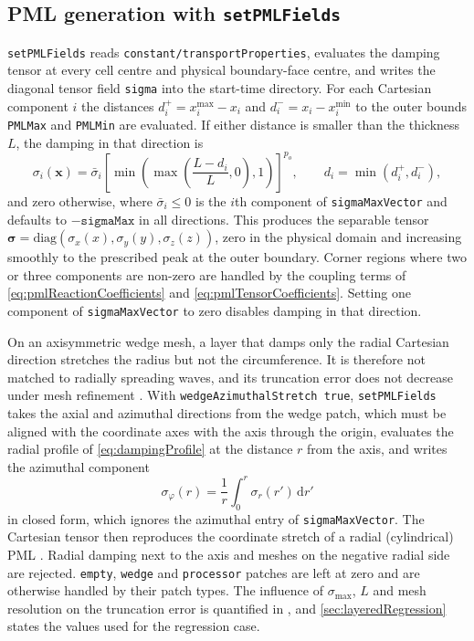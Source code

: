 \documentclass[final,12pt,nopreprintline]{elsarticle}
\newcommand{\code}[1]{\texttt{#1}}
\begin{document}
\subsection{PML generation with \code{setPMLFields}}
\label{sec:setPMLFields}

\code{setPMLFields} reads \code{constant/transportProperties}, evaluates the
damping tensor at every cell centre and physical boundary-face centre, and
writes the diagonal tensor field \code{sigma} into the start-time directory.
For each Cartesian component $i$ the distances $d_i^{+}=x_i^{\max}-x_i$ and
$d_i^{-}=x_i-x_i^{\min}$ to the outer bounds \code{PMLMax} and \code{PMLMin}
are evaluated.  If either distance is smaller than the thickness $L$, the
damping in that direction is
\begin{equation}
    \sigma_i(\mathbf{x})
    =
    \bar{\sigma}_i
    \left[
    \min\left(\max\left(\frac{L-d_i}{L},0\right),1\right)
    \right]^{p_o},
    \qquad
    d_i=\min(d_i^{+},d_i^{-}),
    \label{eq:dampingProfile}
\end{equation}
and zero otherwise, where $\bar{\sigma}_i\le0$ is the $i$th component of
\code{sigmaMaxVector} and defaults to $-\code{sigmaMax}$ in all directions.
This produces the separable tensor
$\boldsymbol{\sigma}=\mathrm{diag}(\sigma_x(x),\sigma_y(y),\sigma_z(z))$,
zero in the physical domain and increasing smoothly to the prescribed peak at
the outer boundary.  Corner regions where two or three components are
non-zero are handled by the coupling terms of \cref{eq:pmlReactionCoefficients}
and \cref{eq:pmlTensorCoefficients}.  Setting one component of
\code{sigmaMaxVector} to zero disables damping in that direction.

On an axisymmetric wedge mesh, a layer that damps only the radial Cartesian
direction stretches the radius but not the circumference.  It is therefore
not matched to radially spreading waves, and its truncation error does not
decrease under mesh refinement \cite{Xu2026HelmholtzPML}.  With
\code{wedgeAzimuthalStretch true}, \code{setPMLFields} takes the axial and
azimuthal directions from the wedge patch, which must be aligned with the
coordinate axes with the axis through the origin, evaluates the radial
profile of \cref{eq:dampingProfile} at the distance $r$ from the axis, and
writes the azimuthal component
\begin{equation}
    \sigma_\varphi(r)=\frac{1}{r}\int_0^r\sigma_r(r')\,\mathrm{d}r'
    \label{eq:wedgeAzimuthalDamping}
\end{equation}
in closed form, which ignores the azimuthal entry of \code{sigmaMaxVector}.
The Cartesian tensor then reproduces the coordinate stretch of a radial
(cylindrical) PML \cite{Xu2026HelmholtzPML}.  Radial damping next to the axis
and meshes on the negative radial side are rejected.  \code{empty},
\code{wedge} and \code{processor} patches are left at zero and are otherwise
handled by their patch types.  The influence of $\sigma_{\max}$, $L$ and mesh
resolution on the truncation error is quantified in \cite{Xu2026HelmholtzPML},
and \cref{sec:layeredRegression} states the values used for the regression
case.
\end{document}
